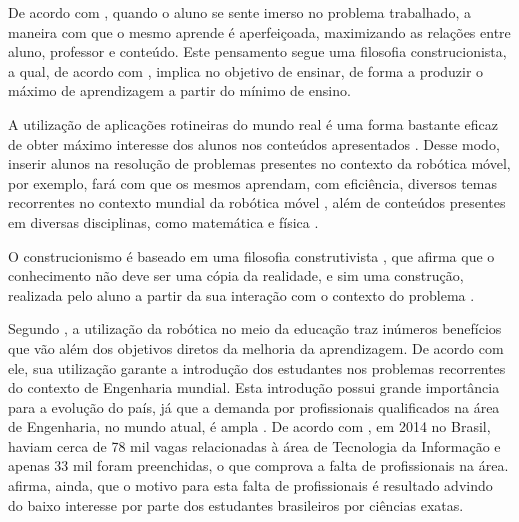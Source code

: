 
	De acordo com \cite{construcionismoPapert}, quando o aluno se sente imerso no problema trabalhado, a maneira com que o mesmo aprende é aperfeiçoada, maximizando as relações entre aluno, professor e conteúdo. Este pensamento segue uma filosofia construcionista, a qual, de acordo com \cite{construcionismoPapert}, implica no objetivo de ensinar, de forma a produzir o máximo de aprendizagem a partir do mínimo de ensino.

	A utilização de aplicações rotineiras do mundo real é uma forma bastante eficaz de obter máximo interesse dos alunos nos conteúdos apresentados \cite{construcionismoPapert}. Desse modo, inserir alunos na resolução de problemas presentes no contexto da robótica móvel, por exemplo, fará com que os mesmos aprendam, com eficiência, diversos temas recorrentes no contexto mundial da robótica móvel \cite{simpleRobotsIntroductionEng}, além de conteúdos presentes em diversas disciplinas, como matemática e física \cite{roboticaEducacionalAulasMatematica}.

	O construcionismo é baseado em uma filosofia construtivista \cite{construcionismoPapert}, que afirma que o conhecimento não deve ser uma cópia da realidade, e sim uma construção, realizada pelo aluno a partir da sua interação com o contexto do problema \cite{oQueEConstrutivismo}.


Segundo \cite{simpleRobotsIntroductionEng}, a utilização da robótica no meio da educação traz inúmeros benefícios que vão além dos objetivos diretos da melhoria da aprendizagem. De acordo com ele, sua utilização garante a introdução dos estudantes nos problemas recorrentes do contexto de Engenharia mundial. Esta introdução possui grande importância para a evolução do país, já que a demanda por profissionais qualificados na área de Engenharia, no mundo atual, é ampla \cite{simpleRobotsIntroductionEng}. De acordo com \cite{analiseFerramentaEnsinoComputacao}, em 2014 no Brasil, haviam cerca de 78 mil vagas relacionadas à área de Tecnologia da Informação e apenas 33 mil foram preenchidas, o que comprova a falta de profissionais na área.  \cite{analiseFerramentaEnsinoComputacao} afirma, ainda, que o motivo para esta falta de profissionais é resultado advindo do baixo interesse por parte dos estudantes brasileiros por ciências exatas.

